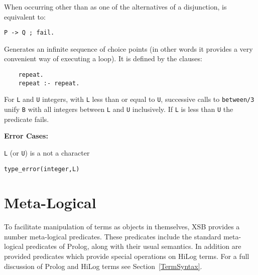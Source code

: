 \begin{description}
  
    When occurring other than as one of the alternatives of a disjunction,
    is equivalent to:
	\begin{center}
	{\tt P -> Q ; fail.}
	\end{center}

  
    Generates an infinite sequence of choice points (in other words it 
    provides a very convenient way of executing a loop). It is defined 
    by the clauses:
    \begin{center}
    \begin{minipage}{1.5in}
    \begin{verbatim}
	repeat.
	repeat :- repeat.
    \end{verbatim}
    \end{minipage}
    \end{center}

%
For {\tt L} and {\tt U} integers, with {\tt L} less than or equal to
{\tt U}, successive calls to {\tt between/3} unify {\tt B} with all
integers between {\tt L} and {\tt U} inclusively.  If {\tt L} is less
than {\tt U} the predicate fails.

{\bf Error Cases:}
\bi
\item 	{\tt L} (or {\tt U}) is a not a character
\bi
\item 	{\tt type\_error(integer,L)}
\ei
\ei
\end{description}



\section{Meta-Logical}\label{MetaLogical}

To facilitate manipulation of terms as objects in themselves,
XSB provides a number meta-logical predicates.  These
predicates include the standard meta-logical predicates of Prolog,
along with their usual semantics.  In addition are provided predicates
which provide special operations on HiLog terms.  For a full
discussion of Prolog and HiLog terms see Section~\ref{TermSyntax}.

